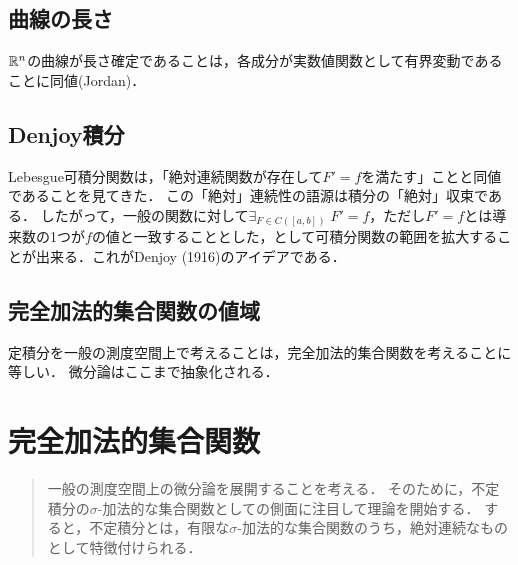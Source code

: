 \documentclass[uplatex, dvipdfmx]{jsreport}
\begin{document}
\section{曲線の長さ}

\begin{tcolorbox}[colframe=ForestGreen, colback=ForestGreen!10!white,breakable,colbacktitle=ForestGreen!40!white,coltitle=black,fonttitle=\bfseries\sffamily,
title=]
    $\mathbb{R}^n$の曲線が長さ確定であることは，各成分が実数値関数として有界変動であることに同値(Jordan)．
\end{tcolorbox}

\section{Denjoy積分}

\begin{tcolorbox}[colframe=ForestGreen, colback=ForestGreen!10!white,breakable,colbacktitle=ForestGreen!40!white,coltitle=black,fonttitle=\bfseries\sffamily,
title=]
    Lebesgue可積分関数は，「絶対連続関数が存在して$F'=f$を満たす」ことと同値であることを見てきた．
    この「絶対」連続性の語源は積分の「絶対」収束である．
    したがって，一般の関数に対して$\exists_{F\in C([a,b])}\;F'=f$，ただし$F'=f$とは導来数の1つが$f$の値と一致することとした，として可積分関数の範囲を拡大することが出来る．これがDenjoy (1916)のアイデアである．
\end{tcolorbox}

\section{完全加法的集合関数の値域}

\begin{tcolorbox}[colframe=ForestGreen, colback=ForestGreen!10!white,breakable,colbacktitle=ForestGreen!40!white,coltitle=black,fonttitle=\bfseries\sffamily,
title=]
    定積分を一般の測度空間上で考えることは，完全加法的集合関数を考えることに等しい．
    微分論はここまで抽象化される．
\end{tcolorbox}

\chapter{完全加法的集合関数}

\begin{quotation}
    一般の測度空間上の微分論を展開することを考える．
    そのために，不定積分の$\sigma$-加法的な集合関数としての側面に注目して理論を開始する．
    すると，不定積分とは，有限な$\sigma$-加法的な集合関数のうち，絶対連続なものとして特徴付けられる．
\end{quotation}
\end{document}
